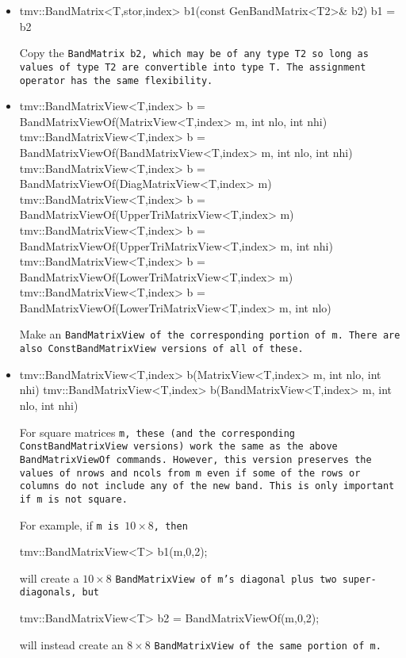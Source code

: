 \begin{itemize}
\item
\begin{tmvcode}
tmv::BandMatrix<T,stor,index> b1(const GenBandMatrix<T2>& b2)
b1 = b2
\end{tmvcode}
Copy the \tt{BandMatrix b2}, which may be of any type \tt{T2} so long
as values of type \tt{T2} are convertible into type \tt{T}.
The assignment operator has the same flexibility.

\item
\begin{tmvcode}
tmv::BandMatrixView<T,index> b = 
      BandMatrixViewOf(MatrixView<T,index> m, int nlo, int nhi)
tmv::BandMatrixView<T,index> b = 
      BandMatrixViewOf(BandMatrixView<T,index> m, int nlo, int nhi)
tmv::BandMatrixView<T,index> b = 
      BandMatrixViewOf(DiagMatrixView<T,index> m)
tmv::BandMatrixView<T,index> b = 
      BandMatrixViewOf(UpperTriMatrixView<T,index> m)
tmv::BandMatrixView<T,index> b = 
      BandMatrixViewOf(UpperTriMatrixView<T,index> m, int nhi)
tmv::BandMatrixView<T,index> b = 
      BandMatrixViewOf(LowerTriMatrixView<T,index> m)
tmv::BandMatrixView<T,index> b = 
      BandMatrixViewOf(LowerTriMatrixView<T,index> m, int nlo)
\end{tmvcode}
Make an \tt{BandMatrixView} of the corresponding portion of \tt{m}.  
There are also \tt{ConstBandMatrixView} versions of all of these.  

\item
\begin{tmvcode}
tmv::BandMatrixView<T,index> b(MatrixView<T,index> m, 
      int nlo, int nhi)
tmv::BandMatrixView<T,index> b(BandMatrixView<T,index> m, 
      int nlo, int nhi)
\end{tmvcode}
For square matrices \tt{m}, these (and the corresponding \tt{ConstBandMatrixView}
versions) work the same as the above \tt{BandMatrixViewOf}
commands.  However, this version preserves the values of \tt{nrows} and \tt{ncols}
from \tt{m}
even if some of the rows or columns do not include any of the new band.
This is only important if \tt{m} is not square.

For example, if \tt{m} is $10 \times 8$, then 
\begin{tmvcode}
tmv::BandMatrixView<T> b1(m,0,2);
\end{tmvcode}
will create a $10 \times 8$ \tt{BandMatrixView} of \tt{m}'s diagonal plus two super-diagonals, but
\begin{tmvcode}
tmv::BandMatrixView<T> b2 = BandMatrixViewOf(m,0,2);
\end{tmvcode}
will instead create an $8 \times 8$ \tt{BandMatrixView} of the same portion of \tt{m}.


\end{itemize}
